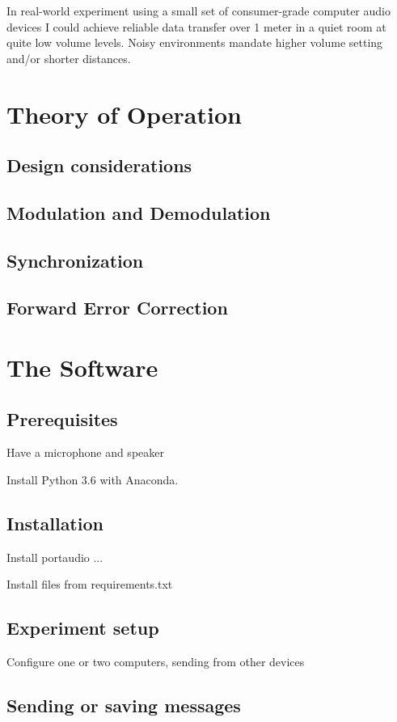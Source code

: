 \documentclass[a4paper]{article}
\begin{document}
In real-world experiment using a small set of consumer-grade computer audio devices I could achieve reliable data transfer over 1 meter in a quiet room at quite low volume levels. Noisy environments mandate higher volume setting and/or shorter distances.
\section{Theory of Operation}
\subsection{Design considerations}
\subsection{Modulation and Demodulation}
\subsection{Synchronization}
\subsection{Forward Error Correction}
\section{The Software}
\label{sec:thesoftware}

\subsection{Prerequisites}

Have a microphone and speaker

Install Python 3.6 with Anaconda.\cite{ana1}

\subsection{Installation}

Install portaudio
...

Install files from requirements.txt

\subsection{Experiment setup}
Configure one or two computers, sending from other devices
\subsection{Sending or saving messages}
\end{document}
